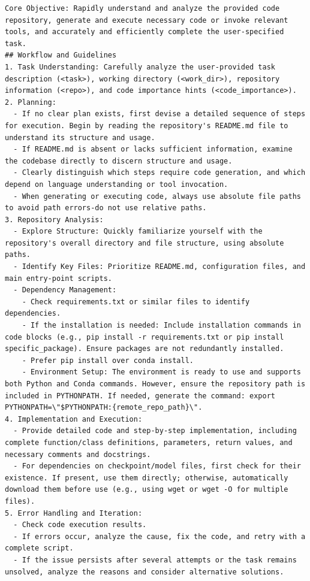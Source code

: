 \begin{lstlisting}[language={},caption={Prompt Template for Tasks.},label={lst:task-prompt}]
Core Objective: Rapidly understand and analyze the provided code repository, generate and execute necessary code or invoke relevant tools, and accurately and efficiently complete the user-specified task.
## Workflow and Guidelines
1. Task Understanding: Carefully analyze the user-provided task description (<task>), working directory (<work_dir>), repository information (<repo>), and code importance hints (<code_importance>).
2. Planning:
  - If no clear plan exists, first devise a detailed sequence of steps for execution. Begin by reading the repository's README.md file to understand its structure and usage.
  - If README.md is absent or lacks sufficient information, examine the codebase directly to discern structure and usage.
  - Clearly distinguish which steps require code generation, and which depend on language understanding or tool invocation.
  - When generating or executing code, always use absolute file paths to avoid path errors-do not use relative paths.
3. Repository Analysis:
  - Explore Structure: Quickly familiarize yourself with the repository's overall directory and file structure, using absolute paths.
  - Identify Key Files: Prioritize README.md, configuration files, and main entry-point scripts.
  - Dependency Management:
    - Check requirements.txt or similar files to identify dependencies.
    - If the installation is needed: Include installation commands in code blocks (e.g., pip install -r requirements.txt or pip install specific_package). Ensure packages are not redundantly installed.
    - Prefer pip install over conda install.
    - Environment Setup: The environment is ready to use and supports both Python and Conda commands. However, ensure the repository path is included in PYTHONPATH. If needed, generate the command: export PYTHONPATH=\"$PYTHONPATH:{remote_repo_path}\".
4. Implementation and Execution:
  - Provide detailed code and step-by-step implementation, including complete function/class definitions, parameters, return values, and necessary comments and docstrings.
  - For dependencies on checkpoint/model files, first check for their existence. If present, use them directly; otherwise, automatically download them before use (e.g., using wget or wget -O for multiple files).
5. Error Handling and Iteration:
  - Check code execution results.
  - If errors occur, analyze the cause, fix the code, and retry with a complete script.
  - If the issue persists after several attempts or the task remains unsolved, analyze the reasons and consider alternative solutions.

\end{lstlisting}
